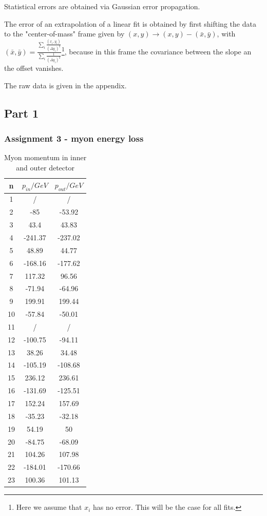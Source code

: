 Statistical errors are obtained via Gaussian error propagation. 

The error of an extrapolation of a linear fit is obtained by first shifting the data to the "center-of-mass" frame given by $(x,y) \to (x,y) - (\bar{x},\bar{y})$, with $(\bar{x},\bar{y}) = \frac{\sum_i \frac{(x_i,y_i)}{(\Delta y_i)^2}}{\sum_i \frac{1}{(\Delta y_i)^2}}$\footnote{Here we assume that $x_i$ has no error. This will be the case for all fits.}, because in this frame the covariance between the slope an the offset vanishes.

The raw data is given in the appendix.

\subsection{Part 1}
\subsubsection{Assignment 3 - myon energy loss}

\begin{table}
\centering
\caption{Myon momentum in inner and outer detector}
\begin{tabular}{ccc}
\toprule
n & $p_{in}/\si{GeV}$ & $p_{out}/\si{GeV}$\\
\midrule
1 & / & /\\
2&	-85&	-53.92\\
3&	43.4&	43.83\\
4&	-241.37&	-237.02\\
5&	48.89&	44.77\\
6&	-168.16&	-177.62\\
7&	117.32&	96.56\\
8&	-71.94&	-64.96\\
9&	199.91&	199.44\\
10&	-57.84&	-50.01\\
11&	/ & /\\
12&-100.75&	-94.11\\
13&	38.26&	34.48\\
14&	-105.19&	-108.68\\
15&	236.12&	236.61\\
16&	-131.69&	-125.51\\
17&	152.24&	157.69\\
18&	-35.23&	-32.18\\
19&	54.19&	50\\
20&	-84.75&	-68.09\\
21&	104.26&	107.98\\
22&	-184.01&	-170.66\\
23&	100.36&	101.13\\
\bottomrule
\end{tabular}
\label{tab:task1_myon}
\end{table}

